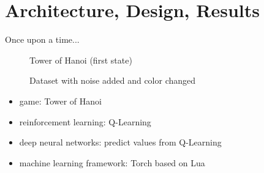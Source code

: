 \documentclass{beamer}
\begin{document}
\section{Architecture, Design, Results}
\begin{frame}{Once upon a time...}
	\begin{minipage}{0.5\textwidth}
		\begin{figure}[H]
			\caption*{Tower of Hanoi (first state)}
		\end{figure}
		\vspace*{-1.45cm}
		\begin{figure}[H]
			\centering
			\captionsetup{justification=centering}
			\caption*{Dataset with noise added and color changed}
		\end{figure}
	\end{minipage} \hfill
	\begin{minipage}{0.45\textwidth}
		\begin{itemize}
			\item game: Tower of Hanoi
			\item reinforcement learning: Q-Learning
			\item deep neural networks: predict values from Q-Learning
			\item machine learning framework: Torch based on Lua
		\end{itemize}
	\end{minipage}
\end{frame}
\end{document}
